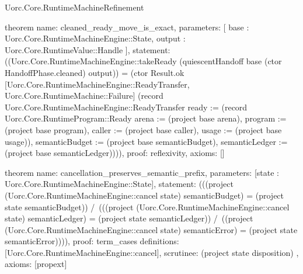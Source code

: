 \begin{lexlean}{Uorc.Core.RuntimeMachineRefinement}
\begin{semanticmodule}
theorem{
  name: cleaned_ready_move_is_exact,
  parameters: [
    base : Uorc.Core.RuntimeMachineEngine::State,
    output : Uorc.Core.RuntimeValue::Handle
  ],
  statement: ((Uorc.Core.RuntimeMachineEngine::takeReady (quiescentHandoff base (ctor HandoffPhase.cleaned) output)) = (ctor Result.ok [Uorc.Core.RuntimeMachineEngine::ReadyTransfer, Uorc.Core.RuntimeMachine::Failure] (record Uorc.Core.RuntimeMachineEngine::ReadyTransfer {ready := (record Uorc.Core.RuntimeProgram::Ready {arena := (project base arena), program := (project base program), caller := (project base caller), usage := (project base usage)}), semanticBudget := (project base semanticBudget), semanticLedger := (project base semanticLedger)}))),
  proof: reflexivity{},
  axioms: []
}

theorem{
  name: cancellation_preserves_semantic_prefix,
  parameters: [state : Uorc.Core.RuntimeMachineEngine::State],
  statement: (((project (Uorc.Core.RuntimeMachineEngine::cancel state) semanticBudget) = (project state semanticBudget)) /\ (((project (Uorc.Core.RuntimeMachineEngine::cancel state) semanticLedger) = (project state semanticLedger)) /\ ((project (Uorc.Core.RuntimeMachineEngine::cancel state) semanticError) = (project state semanticError)))),
  proof: term_cases{
    definitions: [Uorc.Core.RuntimeMachineEngine::cancel],
    scrutinee: (project state disposition)
  },
  axioms: [propext]
}
\end{semanticmodule}
\end{lexlean}
